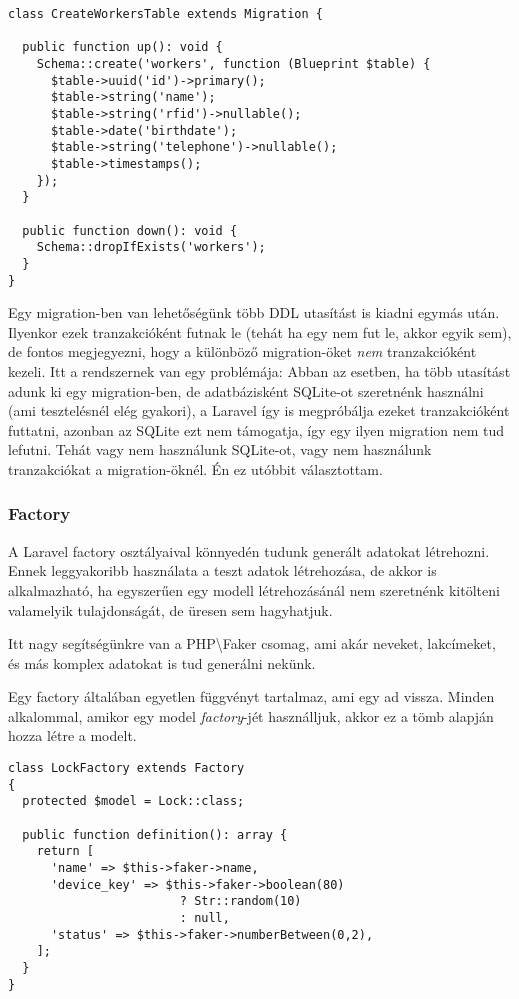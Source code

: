 \documentclass[a4paper,12pt]{thesis-ekf}
\theoremstyle{definition}
\begin{document}
					\begin{lstlisting}[caption={Példa migration (create\_workers\_table.php)}]
class CreateWorkersTable extends Migration {

  public function up(): void {
    Schema::create('workers', function (Blueprint $table) {
      $table->uuid('id')->primary();
      $table->string('name');
      $table->string('rfid')->nullable();
      $table->date('birthdate');
      $table->string('telephone')->nullable();
      $table->timestamps();
    });
  }

  public function down(): void {
    Schema::dropIfExists('workers');
  }
}
					\end{lstlisting}
					Egy migration-ben van lehetőségünk több DDL utasítást is kiadni egymás után. Ilyenkor ezek tranzakcióként futnak le (tehát ha egy nem fut le, akkor egyik sem), de fontos megjegyezni, hogy a különböző migration-öket \emph{nem} tranzakcióként kezeli. Itt a rendszernek van egy problémája: Abban az esetben, ha több utasítást adunk ki egy migration-ben, de adatbázisként SQLite-ot szeretnénk használni (ami tesztelésnél elég gyakori), a Laravel így is megpróbálja ezeket tranzakcióként futtatni, azonban az SQLite ezt nem támogatja, így egy ilyen migration nem tud lefutni. Tehát vagy nem használunk SQLite-ot, vagy nem használunk tranzakciókat a migration-öknél. Én ez utóbbit választottam.
					
				\subsubsection{Factory}\label{sssc-db_factory}
					A Laravel factory osztályaival könnyedén tudunk generált adatokat létrehozni. Ennek leggyakoribb használata a teszt adatok létrehozása, de akkor is alkalmazható, ha egyszerűen egy modell létrehozásánál nem szeretnénk kitölteni valamelyik tulajdonságát, de üresen sem hagyhatjuk.
					
					Itt nagy segítségünkre van a PHP\textbackslash{}Faker csomag, ami akár neveket, lakcímeket, és más komplex adatokat is tud generálni nekünk.
					
					Egy factory általában egyetlen függvényt tartalmaz, ami egy  ad vissza. Minden alkalommal, amikor egy model \emph{factory}-jét használljuk, akkor ez a tömb alapján hozza létre a modelt.
					
					\begin{lstlisting}[caption={Példa Factory (LockFactory.php)}]
class LockFactory extends Factory
{
  protected $model = Lock::class;

  public function definition(): array {
    return [
      'name' => $this->faker->name,
      'device_key' => $this->faker->boolean(80) 
                        ? Str::random(10) 
                        : null,
      'status' => $this->faker->numberBetween(0,2),
    ];
  }
}
					\end{lstlisting}
					
\end{document}
